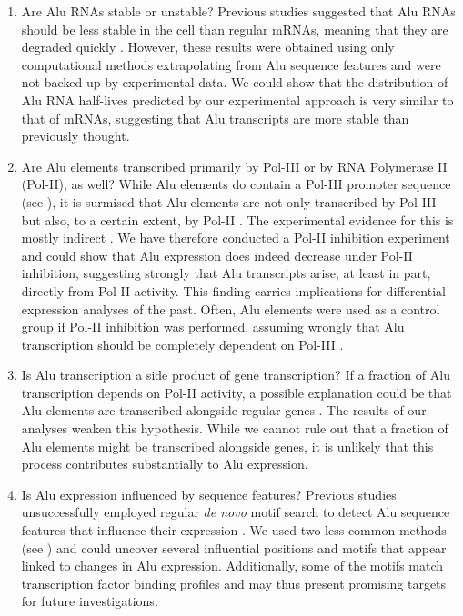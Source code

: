\begin{enumerate}[labelindent=0pt]
  \item Are Alu RNAs stable or unstable?\smallskip\newline
  Previous studies suggested that Alu RNAs should be less stable in the cell
  than regular mRNAs, meaning that they are degraded quickly \citep{An2004}.
  However, these results were obtained using only computational methods
  extrapolating from Alu sequence features and were not backed up by
  experimental data.\newline
  We could show that the distribution of Alu RNA half-lives predicted by our
  experimental approach is very similar to that of mRNAs, suggesting that Alu
  transcripts are more stable than previously thought.

  \item Are Alu elements transcribed primarily by Pol-III or by RNA
  Polymerase II (Pol-II), as well?\smallskip\newline
  While Alu elements do contain a Pol-III promoter sequence (see
  ), it is surmised that Alu elements are not only
  transcribed by Pol-III but also, to a certain extent, by Pol-II
  \citep{Conti2015a,Zhang2019}. The experimental evidence for this is mostly
  indirect \citep{ Zhang2019,Panning1993,JAGADEESWARAN1981}. We have therefore
  conducted a Pol-II inhibition experiment and could show that Alu expression
  does indeed decrease under Pol-II inhibition, suggesting strongly that Alu
  transcripts arise, at least in part, directly from Pol-II activity.\newline
  This finding carries implications for differential expression analyses of
  the past. Often, Alu elements were used as a control group if Pol-II
  inhibition was performed, assuming wrongly that Alu transcription should be
  completely dependent on Pol-III \citep{Cordaux2009}.
  
  \item Is Alu transcription a side product of gene
  transcription?\smallskip\newline
  If a fraction of Alu transcription depends on Pol-II activity, a possible
  explanation could be that Alu elements are transcribed alongside regular
  genes \citep{Conti2015a,Zhang2019}. The results of our analyses weaken this
  hypothesis. While we cannot rule out that a fraction of Alu elements might
  be transcribed alongside genes, it is unlikely that this process contributes
  substantially to Alu expression.
  
  \item Is Alu expression influenced by sequence features?\smallskip\newline
  Previous studies unsuccessfully employed regular \textit{de novo} motif
  search to detect Alu sequence features that influence their expression
  \citep{Zhang2019}. We used two less common methods (see
  ) and could uncover several influential
  positions and motifs that appear linked to changes in Alu expression.
  Additionally, some of the motifs match transcription factor binding profiles
  and may thus present promising targets for future investigations.
\end{enumerate}

